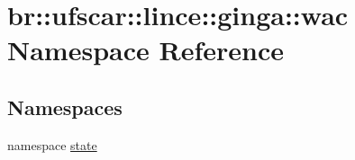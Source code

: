 \hypertarget{namespacebr_1_1ufscar_1_1lince_1_1ginga_1_1wac}{
\section{br::ufscar::lince::ginga::wac Namespace Reference}
\label{namespacebr_1_1ufscar_1_1lince_1_1ginga_1_1wac}
}
\subsection*{Namespaces}
\begin{DoxyCompactItemize}
\item 
namespace \hyperlink{namespacebr_1_1ufscar_1_1lince_1_1ginga_1_1wac_1_1state}{state}
\end{DoxyCompactItemize}
